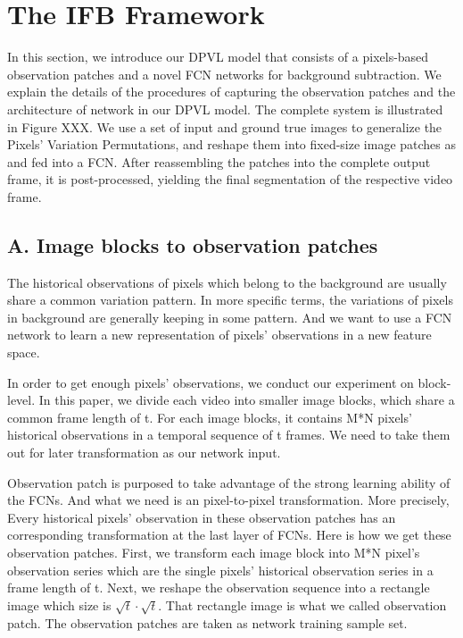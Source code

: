 \documentclass[journal]{IEEEtran}
\begin{document}
\section{The IFB Framework}
\label{sec3}
In this section, we introduce our DPVL model that consists of a pixels-based observation patches and a novel FCN networks for background subtraction.
We explain the details of the procedures of capturing the observation patches and the architecture of network in our DPVL model.
The complete system is illustrated in Figure XXX.
We use a set of input and ground true images to generalize the Pixels’ Variation Permutations, and reshape them into fixed-size image patches as and fed into a FCN.
After reassembling the patches into the complete output frame, it is post-processed, yielding the final segmentation of the respective video frame.

\subsection{A. Image blocks to observation  patches}
\label{sec3_fc}
The historical observations of pixels which belong to the background are usually share a common variation pattern.
In more specific terms, the variations of pixels in background are generally keeping in some pattern.
And we want to use a FCN network to learn a new representation of pixels’ observations in a new feature space.
  
In order to get enough pixels’ observations, we conduct our experiment on block-level.
In this paper, we divide each video into smaller image blocks, which share a common frame length of t.
For each image blocks, it contains M*N pixels’ historical observations in a temporal sequence of t frames.
We need to take them out for later transformation as our network input.

Observation patch is purposed to take advantage of the strong learning ability of the FCNs.
And what we need is an pixel-to-pixel transformation.
More precisely, Every historical pixels’ observation in these observation patches has an corresponding transformation  at the last layer of FCNs.
Here is how we get these observation patches.
First, we transform each image block into M*N pixel’s observation series which are the  single pixels’ historical observation series in a frame length of t.
Next, we reshape the observation sequence into a rectangle image which size is $\sqrt{t}\cdot \sqrt{t}$.
That rectangle image is what we called observation patch.
The observation patches are taken as network training sample set.
\end{document}
